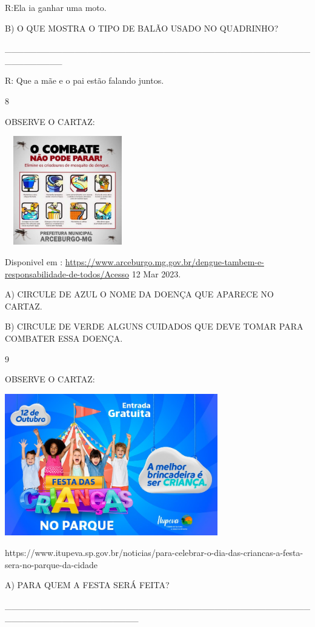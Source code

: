 {{R:Ela ia ganhar uma moto.

B) O QUE MOSTRA O TIPO DE BALÃO USADO NO QUADRINHO?

\_\_\_\_\_\_\_\_\_\_\_\_\_\_\_\_\_\_\_\_\_\_\_\_\_\_\_\_\_\_\_\_\_\_\_\_\_\_\_\_\_\_\_\_\_\_\_\_\_\_\_\_\_\_\_\_\_

R: Que a mãe e o pai estão falando juntos.

\num{8}

OBSERVE O CARTAZ:

\includegraphics[width=2.15306in,height=1.86730in]{media/image134.jpeg}

Disponivel em :
\url{https://www.arceburgo.mg.gov.br/dengue-tambem-e-responsabilidade-de-todos/Acesso}
12 Mar 2023.

A) CIRCULE DE AZUL O NOME DA DOENÇA QUE APARECE NO CARTAZ.

B) CIRCULE DE VERDE ALGUNS CUIDADOS QUE DEVE TOMAR PARA COMBATER ESSA
DOENÇA.

\num{9}

OBSERVE O CARTAZ:

\includegraphics[width=3.66026in,height=2.43572in]{media/image135.jpeg}

https://www.itupeva.sp.gov.br/noticias/para-celebrar-o-dia-das-criancas-a-festa-sera-no-parque-da-cidade

A) PARA QUEM A FESTA SERÁ FEITA?

\_\_\_\_\_\_\_\_\_\_\_\_\_\_\_\_\_\_\_\_\_\_\_\_\_\_\_\_\_\_\_\_\_\_\_\_\_\_\_\_\_\_\_\_\_\_\_\_\_\_\_\_\_\_\_\_\_\_\_\_\_\_\_\_\_\_\_\_\_

}}
